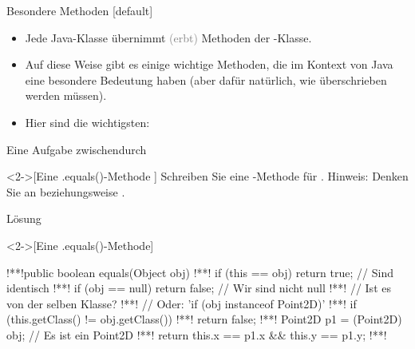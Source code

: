 \begin{frame}{Besondere Methoden}
[default]%
\begin{itemize}[<+(1)->]
    \widei
    \item Jede Java-Klasse übernimmt \textcolor{gray}{(erbt)} Methoden der -Klasse.
    \item Auf diese Weise gibt es einige wichtige Methoden,\pause{} die im Kontext von Java eine besondere Bedeutung haben\pause{} (aber dafür natürlich, wie  überschrieben werden müssen).
    \item Hier sind die wichtigsten:
\end{itemize}
\end{frame}

\ifull
\begin{frame}[c]{Eine Aufgabe zwischendurch}
    \begin{exercise}<2->[Eine .equals()-Methode ]
        Schreiben Sie eine -Methode für .\pause{} Hinweis: Denken Sie an  beziehungsweise .
    \end{exercise}
\end{frame}

\begin{frame}[c,fragile]{Lösung}
    \begin{solve}<2->[Eine .equals()-Methode]
\begin{plainjava}
!**!public boolean equals(Object obj) {
!**!    if (this == obj) return true; // Sind identisch
!**!    if (obj == null) return false; // Wir sind nicht null
!**!    // Ist es von der selben Klasse?
!**!    // Oder: 'if (obj instanceof Point2D)'
!**!    if (this.getClass() != obj.getClass())
!**!        return false;
!**!    Point2D p1 = (Point2D) obj; // Es ist ein Point2D
!**!    return this.x == p1.x && this.y == p1.y;
!**!}
\end{plainjava}
    \end{solve}
\end{frame}
\fi

